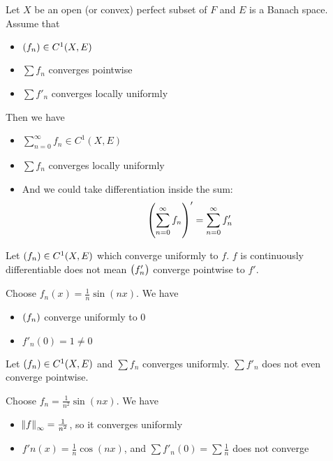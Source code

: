 \begin{theorem}
    Let $X$ be an open (or convex) perfect subset of $F$ and $E$ is a Banach space. Assume that
    \begin{itemize}
        \item $\sequence{f_n} \in C^1(X,E)$
        \item $\sum f_n$ converges pointwise
        \item $\sum f'_n$ converges locally uniformly
    \end{itemize}
    
    Then we have
    \begin{itemize}
        \item $\sum_{n=0}^\infty f_n \in C^1(X,E)$
        \item $\sum f_n$ converges locally uniformly
        \item And we could take differentiation inside the sum: \begin{equation}
        \mleft( \sum_{n=0}^\infty f_n \mright)' = \sum_{n=0}^\infty f'_n
    \end{equation}
    \end{itemize}
\end{theorem}


\begin{example}
    Let $\sequence{f_n} \in C^1(X,E)$ which converge uniformly to $f$. $f$ is continuously differentiable does not mean $\sequence{f'_n}$ converge pointwise to $f'$.
    
    Choose $f_n(x) = \frac{1}{n} \sin (nx)$. We have
    \begin{itemize}
        \item $\sequence{f_n}$ converge uniformly to $0$
        \item $f'_n(0) = 1 \neq 0$
    \end{itemize}
\end{example}

\begin{example}
    Let $\sequence{f_n} \in C^1(X,E)$ and $\sum f_n$ converges uniformly. $\sum f'_n$ does not even converge pointwise.
    
    Choose $f_n = \frac{1}{n^2} \sin (nx)$. We have
    \begin{itemize}
        \item $\norm{f}_\infty = \frac{1}{n^2}$, so it converges uniformly
        \item $f'n(x) = \frac{1}{n} \cos (nx)$, and $\sum f'_n(0) = \sum \frac{1}{n}$ does not converge
    \end{itemize}
\end{example}





